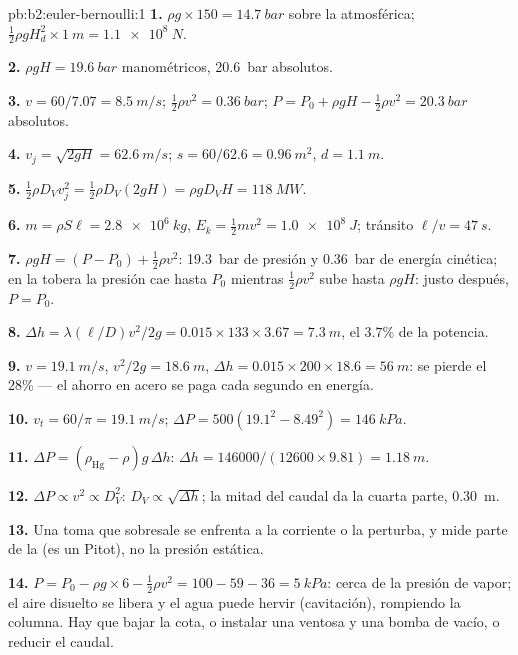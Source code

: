 \begin{solution}{pb:b2:euler-bernoulli:1}
\textbf{1.} $\rho g \times 150 = \qty{14.7}{bar}$ sobre la atmosférica; $\tfrac12\rho gH_d^2
\times \qty{1}{m} = \qty{1.1e8}{N}$.

\textbf{2.} $\rho gH = \qty{19.6}{bar}$ manométricos, \qty{20.6}{bar} absolutos.

\textbf{3.} $v = 60/7.07 = \qty{8.5}{m/s}$; $\tfrac12\rho v^2 = \qty{0.36}{bar}$; $P =
P_0 + \rho gH - \tfrac12\rho v^2 = \qty{20.3}{bar}$ absolutos.

\textbf{4.} $v_j = \sqrt{2gH} = \qty{62.6}{m/s}$; $s = 60/62.6 = \qty{0.96}{m^2}$, $d =
\qty{1.1}{m}$.

\textbf{5.} $\tfrac12\rho D_Vv_j^2 = \tfrac12\rho D_V(2gH) = \rho gD_VH = \qty{118}{MW}$.

\textbf{6.} $m = \rho S\ell = \qty{2.8e6}{kg}$, $E_k = \tfrac12mv^2 = \qty{1.0e8}{J}$;
tránsito $\ell/v = \qty{47}{s}$.

\textbf{7.} $\rho gH = (P - P_0) + \tfrac12\rho v^2$: \qty{19.3}{bar} de presión
y \qty{0.36}{bar} de energía cinética; en la tobera la presión cae hasta
$P_0$ mientras $\tfrac12\rho v^2$ sube hasta $\rho gH$: justo después, $P = P_0$.

\textbf{8.} $\Delta h = \lambda(\ell/D)v^2/2g = 0.015 \times 133 \times 3.67 = \qty{7.3}{m}$,
el $3.7\%$ de la potencia.

\textbf{9.} $v = \qty{19.1}{m/s}$, $v^2/2g = \qty{18.6}{m}$, $\Delta h = 0.015 \times 200 \times
18.6 = \qty{56}{m}$: se pierde el $28\%$ --- el ahorro en acero se paga cada
segundo en energía.

\textbf{10.} $v_t = 60/\pi = \qty{19.1}{m/s}$; $\Delta P = 500(19.1^2 - 8.49^2) =
\qty{146}{kPa}$.

\textbf{11.} $\Delta P = (\rho_{\text{Hg}} - \rho)g\,\Delta h$: $\Delta h = 146000/(12600
\times 9.81) = \qty{1.18}{m}$.

\textbf{12.} $\Delta P \propto v^2 \propto D_V^2$: $D_V \propto \sqrt{\Delta h}$; la mitad
del caudal da la cuarta parte, \qty{0.30}{m}.

\textbf{13.} Una toma que sobresale se enfrenta a la corriente o la
perturba, y mide parte de la  (es un Pitot), no la presión
estática.

\textbf{14.} $P = P_0 - \rho g \times 6 - \tfrac12\rho v^2 = 100 - 59 - 36 = \qty{5}{kPa}$:
cerca de la presión de vapor; el aire disuelto se libera y el agua puede
hervir (cavitación), rompiendo la columna. Hay que bajar la cota, o
instalar una ventosa y una bomba de vacío, o reducir el caudal.


\end{solution}
